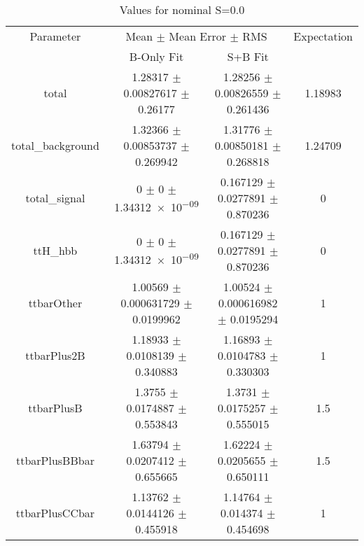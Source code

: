 \begin{table}
\centering
\caption{Values for nominal S=0.0}
\begin{tabular}{cccc}
\toprule
Parameter & \multicolumn{2}{c}{Mean $\pm$ Mean Error $\pm$ RMS} & Expectation\\
 & B-Only Fit & S+B Fit & \\
\midrule
total & \num{1.28317} $\pm$ \num{0.00827617} $\pm$ \num{0.26177} & \num{1.28256} $\pm$ \num{0.00826559} $\pm$ \num{0.261436} & \num{1.18983}\\
total\_background & \num{1.32366} $\pm$ \num{0.00853737} $\pm$ \num{0.269942} & \num{1.31776} $\pm$ \num{0.00850181} $\pm$ \num{0.268818} & \num{1.24709}\\
total\_signal & \num{0} $\pm$ \num{0} $\pm$ \num{1.34312e-09} & \num{0.167129} $\pm$ \num{0.0277891} $\pm$ \num{0.870236} & \num{0}\\
ttH\_hbb & \num{0} $\pm$ \num{0} $\pm$ \num{1.34312e-09} & \num{0.167129} $\pm$ \num{0.0277891} $\pm$ \num{0.870236} & \num{0}\\
ttbarOther & \num{1.00569} $\pm$ \num{0.000631729} $\pm$ \num{0.0199962} & \num{1.00524} $\pm$ \num{0.000616982} $\pm$ \num{0.0195294} & \num{1}\\
ttbarPlus2B & \num{1.18933} $\pm$ \num{0.0108139} $\pm$ \num{0.340883} & \num{1.16893} $\pm$ \num{0.0104783} $\pm$ \num{0.330303} & \num{1}\\
ttbarPlusB & \num{1.3755} $\pm$ \num{0.0174887} $\pm$ \num{0.553843} & \num{1.3731} $\pm$ \num{0.0175257} $\pm$ \num{0.555015} & \num{1.5}\\
ttbarPlusBBbar & \num{1.63794} $\pm$ \num{0.0207412} $\pm$ \num{0.655665} & \num{1.62224} $\pm$ \num{0.0205655} $\pm$ \num{0.650111} & \num{1.5}\\
ttbarPlusCCbar & \num{1.13762} $\pm$ \num{0.0144126} $\pm$ \num{0.455918} & \num{1.14764} $\pm$ \num{0.014374} $\pm$ \num{0.454698} & \num{1}\\
\bottomrule
\end{tabular}
\end{table}